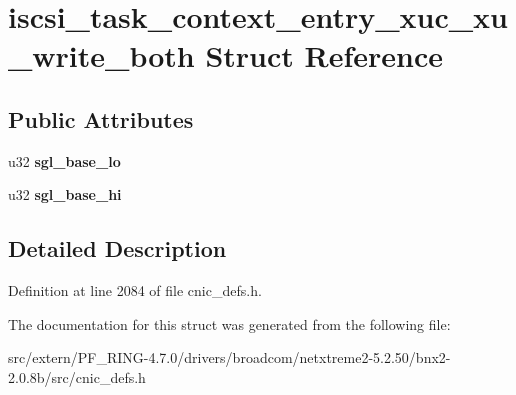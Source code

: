 \hypertarget{structiscsi__task__context__entry__xuc__xu__write__both}{
\section{iscsi\_\-task\_\-context\_\-entry\_\-xuc\_\-xu\_\-write\_\-both Struct Reference}
\label{structiscsi__task__context__entry__xuc__xu__write__both}
}
\subsection*{Public Attributes}
\begin{DoxyCompactItemize}
\item 
\hypertarget{structiscsi__task__context__entry__xuc__xu__write__both_a2b55c2f2c48d4d2e9ebfa7d937f3bc2c}{
u32 {\bfseries sgl\_\-base\_\-lo}}
\label{structiscsi__task__context__entry__xuc__xu__write__both_a2b55c2f2c48d4d2e9ebfa7d937f3bc2c}

\item 
\hypertarget{structiscsi__task__context__entry__xuc__xu__write__both_ac192fa51b27e3128752604750350a711}{
u32 {\bfseries sgl\_\-base\_\-hi}}
\label{structiscsi__task__context__entry__xuc__xu__write__both_ac192fa51b27e3128752604750350a711}

\end{DoxyCompactItemize}


\subsection{Detailed Description}


Definition at line 2084 of file cnic\_\-defs.h.



The documentation for this struct was generated from the following file:\begin{DoxyCompactItemize}
\item 
src/extern/PF\_\-RING-\/4.7.0/drivers/broadcom/netxtreme2-\/5.2.50/bnx2-\/2.0.8b/src/cnic\_\-defs.h\end{DoxyCompactItemize}
